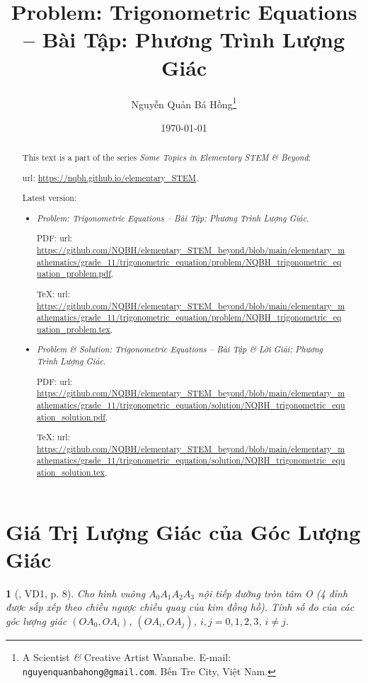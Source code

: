 \documentclass{article}
\title{Problem: Trigonometric Equations -- Bài Tập: Phương Trình Lượng Giác}
\author{Nguyễn Quản Bá Hồng\footnote{A Scientist {\it\&} Creative Artist Wannabe. E-mail: {\tt nguyenquanbahong@gmail.com}. Bến Tre City, Việt Nam.}}
\date{\today}
\newtheorem{baitoan}{}
\begin{document}
\maketitle
\begin{abstract}
	This text is a part of the series {\it Some Topics in Elementary STEM \& Beyond}:
	
	{\sc url}: \url{https://nqbh.github.io/elementary_STEM}.
	
	Latest version:
	\begin{itemize}
		\item {\it Problem: Trigonometric Equations -- Bài Tập: Phương Trình Lượng Giác}.
		
		PDF: {\sc url}: \url{https://github.com/NQBH/elementary_STEM_beyond/blob/main/elementary_mathematics/grade_11/trigonometric_equation/problem/NQBH_trigonometric_equation_problem.pdf}.
		
		\TeX: {\sc url}: \url{https://github.com/NQBH/elementary_STEM_beyond/blob/main/elementary_mathematics/grade_11/trigonometric_equation/problem/NQBH_trigonometric_equation_problem.tex}.
		\item {\it Problem \& Solution: Trigonometric Equations -- Bài Tập \& Lời Giải: Phương Trình Lượng Giác}.
		
		PDF: {\sc url}: \url{https://github.com/NQBH/elementary_STEM_beyond/blob/main/elementary_mathematics/grade_11/trigonometric_equation/solution/NQBH_trigonometric_equation_solution.pdf}.
		
		\TeX: {\sc url}: \url{https://github.com/NQBH/elementary_STEM_beyond/blob/main/elementary_mathematics/grade_11/trigonometric_equation/solution/NQBH_trigonometric_equation_solution.tex}.
	\end{itemize}
\end{abstract}
\tableofcontents


\section{Giá Trị Lượng Giác của Góc Lượng Giác}

\begin{baitoan}[\cite{Hung_nang_cao_phat_trien_Toan_11_tap_1}, VD1, p. 8]
	Cho hình vuông $A_0A_1A_2A_3$ nội tiếp đường  tròn tâm O (4 đỉnh được sắp xếp theo chiều ngược chiều quay của kim đồng hồ). Tính số đo của các góc lượng giác $(OA_0,OA_i)$, $(OA_i,OA_j)$, $i,j = 0,1,2,3$, $i\ne j$.
\end{baitoan}
\end{document}
